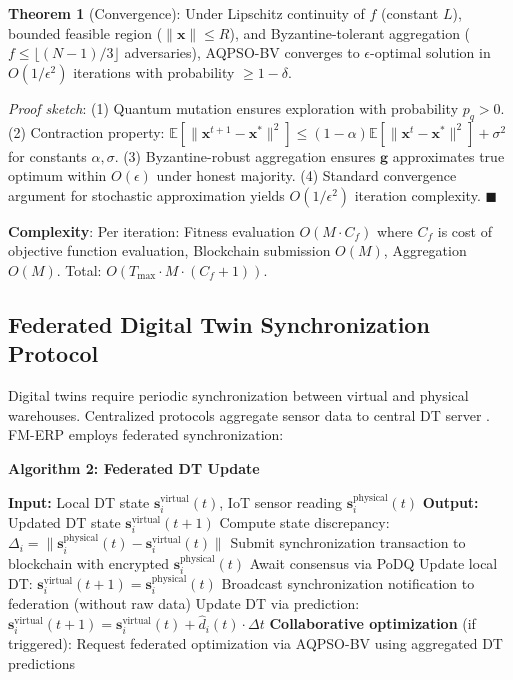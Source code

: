 \documentclass[times,10pt,twocolumn]{jucs2e}
\providecommand{\qed}{\hfill $\blacksquare$}
\begin{document}
\textbf{Theorem 1} (Convergence): Under Lipschitz continuity of $f$ (constant $L$), bounded feasible region ($\|\mathbf{x}\| \leq R$), and Byzantine-tolerant aggregation ($f \leq \lfloor (N-1)/3 \rfloor$ adversaries), AQPSO-BV converges to $\epsilon$-optimal solution in $O(1/\epsilon^2)$ iterations with probability $\geq 1-\delta$.

\textit{Proof sketch}: (1) Quantum mutation ensures exploration with probability $p_q > 0$. (2) Contraction property: $\mathbb{E}[\|\mathbf{x}^{t+1} - \mathbf{x}^*\|^2] \leq (1-\alpha)\mathbb{E}[\|\mathbf{x}^t - \mathbf{x}^*\|^2] + \sigma^2$ for constants $\alpha, \sigma$. (3) Byzantine-robust aggregation ensures $\mathbf{g}$ approximates true optimum within $O(\epsilon)$ under honest majority. (4) Standard convergence argument for stochastic approximation \cite{Borkar2008} yields $O(1/\epsilon^2)$ iteration complexity. \qed

\textbf{Complexity}: Per iteration: Fitness evaluation $O(M \cdot C_f)$ where $C_f$ is cost of objective function evaluation, Blockchain submission $O(M)$, Aggregation $O(M)$. Total: $O(T_{\max} \cdot M \cdot (C_f + 1))$.

\subsection{Federated Digital Twin Synchronization Protocol}

Digital twins require periodic synchronization between virtual and physical warehouses. Centralized protocols aggregate sensor data to central DT server \cite{Tao2019}. FM-ERP employs federated synchronization:

\textbf{Algorithm 2: Federated DT Update}

\begin{algorithmic}[1]
\STATE \textbf{Input:} Local DT state $\mathbf{s}_i^{\text{virtual}}(t)$, IoT sensor reading $\mathbf{s}_i^{\text{physical}}(t)$
\STATE \textbf{Output:} Updated DT state $\mathbf{s}_i^{\text{virtual}}(t+1)$
\STATE Compute state discrepancy: $\Delta_i = \|\mathbf{s}_i^{\text{physical}}(t) - \mathbf{s}_i^{\text{virtual}}(t)\|$
    \STATE Submit synchronization transaction to blockchain with encrypted $\mathbf{s}_i^{\text{physical}}(t)$
    \STATE Await consensus via PoDQ
    \STATE Update local DT: $\mathbf{s}_i^{\text{virtual}}(t+1) = \mathbf{s}_i^{\text{physical}}(t)$
    \STATE Broadcast synchronization notification to federation (without raw data)
\ELSE
    \STATE Update DT via prediction: $\mathbf{s}_i^{\text{virtual}}(t+1) = \mathbf{s}_i^{\text{virtual}}(t) + \hat{d}_i(t) \cdot \Delta t$
\ENDIF
\STATE \textbf{Collaborative optimization} (if triggered):
\STATE Request federated optimization via AQPSO-BV using aggregated DT predictions
\end{algorithmic}
\end{document}
